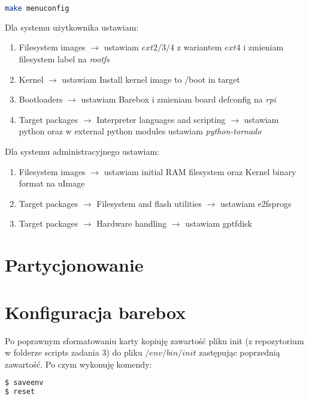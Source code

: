 \begin{lstlisting}[language=bash]
make menuconfig
\end{lstlisting}	

Dla systemu użytkownika ustawiam:
\begin{enumerate}
\item Filesystem images $\rightarrow$ ustawiam $ext2/3/4$ z wariantem $ext4$ i zmieniam filesystem label na \emph{rootfs}
\item Kernel $\rightarrow$ ustawiam Install kernel image to /boot in target
\item Bootloaders $\rightarrow$ ustawiam Barebox i zmieniam board defconfig na \emph{rpi}
\item Target packages $\rightarrow$ Interpreter languages and scripting $\rightarrow$ ustawiam python oraz w external python modules ustawiam \emph{python-tornado}
\end{enumerate}

Dla systemu administracyjnego ustawiam:
\begin{enumerate}
\item Filesystem images $\rightarrow$ ustawiam initial RAM filesystem oraz Kernel binary format na uImage
\item Target packages $\rightarrow$ Filesystem and flash utilities $\rightarrow$ ustawiam e2fsprogs
\item Target packages $\rightarrow$ Hardware handling $\rightarrow$ ustawiam gptfdisk 
\end{enumerate}

\section{Partycjonowanie}


\section{Konfiguracja barebox}
Po poprawnym sformatowaniu karty kopiuję zawartość pliku init (z repozytorium w folderze scripts zadania 3) do pliku $ /env/bin/init $ zastępując poprzednią zawartość. Po czym wykonuję komendy:
\begin{lstlisting}[language=bash]
$ saveenv
$ reset
\end{lstlisting}	

